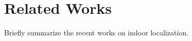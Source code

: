 
\section{Related Works}
\label{sec:related-works}
Briefly summarize the recent works on indoor localization.


